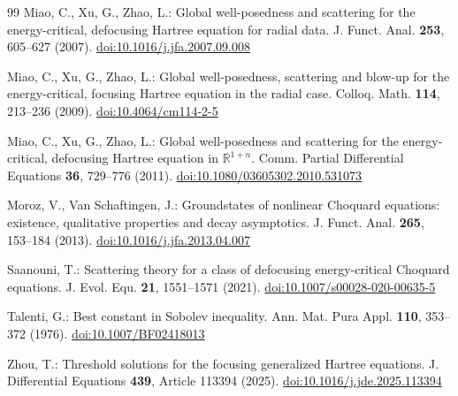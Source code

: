 \documentclass[preprint,12pt]{elsarticle}
\numberwithin{equation}{section}
\theoremstyle{remark}
\newcommand{\R}{\mathbb R}
\begin{document}
\begin{thebibliography}{99}
Miao, C., Xu, G., Zhao, L.:
Global well-posedness and scattering for the energy-critical, defocusing Hartree equation for radial data.
J. Funct. Anal. \textbf{253}, 605--627 (2007).
\href{https://doi.org/10.1016/j.jfa.2007.09.008}{doi:10.1016/j.jfa.2007.09.008}

Miao, C., Xu, G., Zhao, L.:
Global well-posedness, scattering and blow-up for the energy-critical, focusing Hartree equation in the radial case.
Colloq. Math. \textbf{114}, 213--236 (2009).
\href{https://doi.org/10.4064/cm114-2-5}{doi:10.4064/cm114-2-5}

Miao, C., Xu, G., Zhao, L.:
Global well-posedness and scattering for the energy-critical, defocusing Hartree equation in $\R^{1+n}$.
Comm. Partial Differential Equations \textbf{36}, 729--776 (2011).
\href{https://doi.org/10.1080/03605302.2010.531073}{doi:10.1080/03605302.2010.531073}

Moroz, V., Van Schaftingen, J.:
Groundstates of nonlinear Choquard equations: existence, qualitative properties and decay asymptotics.
J. Funct. Anal. \textbf{265}, 153--184 (2013).
\href{https://doi.org/10.1016/j.jfa.2013.04.007}{doi:10.1016/j.jfa.2013.04.007}

Saanouni, T.:
Scattering theory for a class of defocusing energy-critical Choquard equations.
J. Evol. Equ. \textbf{21}, 1551--1571 (2021).
\href{https://doi.org/10.1007/s00028-020-00635-5}{doi:10.1007/s00028-020-00635-5}

Talenti, G.:
Best constant in Sobolev inequality.
Ann. Mat. Pura Appl. \textbf{110}, 353--372 (1976).
\href{https://doi.org/10.1007/BF02418013}{doi:10.1007/BF02418013}

Zhou, T.:
Threshold solutions for the focusing generalized Hartree equations.
J. Differential Equations \textbf{439}, Article 113394 (2025).
\href{https://doi.org/10.1016/j.jde.2025.113394}{doi:10.1016/j.jde.2025.113394}

\end{thebibliography}
\end{document}
